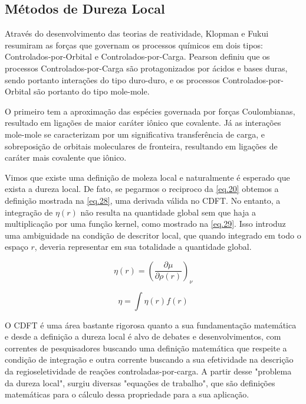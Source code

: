 \documentclass[a4paper,11pt]{refart}
\begin{document}
\subsection{Métodos de Dureza Local}

Através do desenvolvimento das teorias de reatividade, Klopman e Fukui resumiram as forças que governam os processos químicos em dois tipos: Controlados-por-Orbital e Controlados-por-Carga\cite{klopman1968,fukui1970theory}. Pearson definiu que os processos Controlados-por-Carga são protagonizados por ácidos e bases duras, sendo portanto interações do tipo duro-duro, e os processos Controlados-por-Orbital são portanto do tipo mole-mole\cite{Pearson1990}. 

O primeiro tem a aproximação das espécies governada por forças Coulombianas, resultado em ligações de maior caráter iônico que covalente. Já as interações mole-mole se caracterizam por um significativa transferência de carga, e sobreposição de orbitais moleculares de fronteira, resultando em ligações de caráter mais covalente que iônico.

Vimos que existe uma definição de moleza local e naturalmente é esperado que exista a dureza local. De fato, se pegarmos o reciproco da \autoref{eq.20} obtemos a definição mostrada na \autoref{eq.28}, uma derivada válida no CDFT. No entanto, a integração de $\eta(r)$ não resulta na quantidade global sem que haja a multiplicação por uma função kernel, como mostrado na \autoref{eq.29}. Isso introduz uma ambiguidade na condição de descritor local, que quando integrado em todo o espaço $r$, deveria representar em sua totalidade a quantidade global.  

\begin{equation}
\eta(r) = \left( \frac{\partial \mu}{\partial \rho(r) } \right)_\nu
\label{eq.28}
\end{equation}

\begin{equation}
\eta = \int \eta(r) f(r)
\label{eq.29}
\end{equation}

O CDFT é uma área bastante rigorosa quanto a sua fundamentação matemática e desde a definição a dureza local é alvo de debates e desenvolvimentos, com correntes de pesquisadores buscando uma definição matemática que respeite a condição de integração e outra corrente buscando a sua efetividade na descrição da regioseletividade de reações controladas-por-carga. A partir desse "problema da dureza local", surgiu diversas "equações de trabalho", que são definições matemáticas para o cálculo dessa propriedade para a sua aplicação. 
\end{document}
